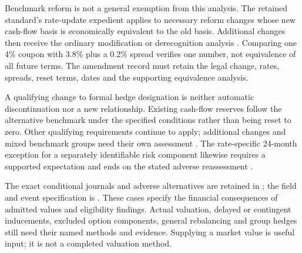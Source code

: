 Benchmark reform is not a general exemption from this analysis. The retained
standard's rate-update expedient applies to necessary reform changes whose
new cash-flow basis is economically equivalent to the old basis. Additional
changes then receive the ordinary modification or derecognition analysis
\citep[5.4.5--9]{aasb9dated}. Comparing one 4\% coupon with 3.8\% plus
a 0.2\% spread verifies one number, not equivalence of all future terms.
The amendment record must retain the legal change, rates, spreads, reset
terms, dates and the supporting equivalence analysis.

A qualifying change to formal hedge designation is neither automatic
discontinuation nor a new relationship. Existing cash-flow reserves follow
the alternative benchmark under the specified conditions rather than being
reset to zero. Other qualifying requirements continue to apply; additional
changes and mixed benchmark groups need their own assessment
\citep[6.9.1--10]{aasb9dated}. The rate-specific 24-month exception for a
separately identifiable risk component likewise requires a supported
expectation and ends on the stated adverse reassessment
\citep[6.9.11--13]{aasb9dated}.

The exact conditional journals and adverse alternatives are retained in
;
the field and event specification is
.
These cases specify the financial consequences of admitted values and
eligibility findings. Actual valuation, delayed or contingent inducements,
excluded option components, general rebalancing and group hedges still need
their named methods and evidence. Supplying a market value is useful input;
it is not a completed valuation method.
